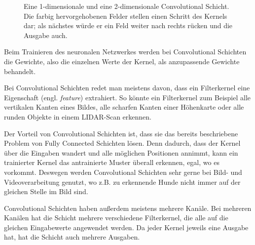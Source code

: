 \documentclass[10pt]{article}
\newcommand{\eng}[1]{\textit{#1}}
\begin{document}
\begin{figure}[h!]
    \caption{Eine 1-dimensionale und eine 2-dimensionale Convolutional Schicht. Die farbig hervorgehobenen Felder stellen einen Schritt des Kernels dar; als nächstes würde er ein Feld weiter nach rechts rücken und die Ausgabe auch.} %
    \label{fig:conv_layers}
\end{figure}

Beim Trainieren des neuronalen Netzwerkes werden bei Convolutional Schichten die Gewichte, also die einzelnen Werte der Kernel, als anzupassende Gewichte behandelt.

Bei Convolutional Schichten redet man meistens davon, dass ein Filterkernel eine Eigenschaft (engl. \eng{feature}) extrahiert.
So könnte ein Filterkernel zum Beispiel alle vertikalen Kanten eines Bildes, alle scharfen Kanten einer Höhenkarte oder alle runden Objekte in einem LIDAR-Scan erkennen.

Der Vorteil von Convolutional Schichten ist, dass sie das bereits beschriebene Problem von Fully Connected Schichten lösen.
Denn dadurch, dass der Kernel über die Eingaben wandert und alle möglichen Positionen annimmt, kann ein trainierter Kernel das antrainierte Muster überall erkennen, egal, wo es vorkommt.
Deswegen werden Convolutional Schichten sehr gerne bei Bild- und Videoverarbeitung genutzt, wo z.B. zu erkennende Hunde nicht immer auf der gleichen Stelle im Bild sind. %


Convolutional Schichten haben außerdem meistens mehrere Kanäle. 
Bei mehreren Kanälen hat die Schicht mehrere verschiedene Filterkernel, die alle auf die gleichen Eingabewerte angewendet werden.
Da jeder Kernel jeweils eine Ausgabe hat, hat die Schicht auch mehrere Ausgaben.
\end{document}
